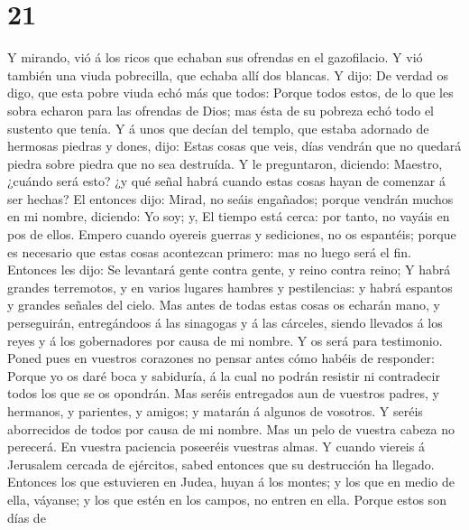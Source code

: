 \hypertarget{section-20}{%
\section{21}\label{section-20}}

 Y mirando, vió á los ricos que echaban sus ofrendas en el
gazofilacio.  Y vió también una viuda pobrecilla, que
echaba allí dos blancas.  Y dijo: De verdad os digo, que
esta pobre viuda echó más que todos:  Porque todos estos,
de lo que les sobra echaron para las ofrendas de Dios; mas ésta de su
pobreza echó todo el sustento que tenía.  Y á unos que
decían del templo, que estaba adornado de hermosas piedras y dones,
dijo:  Estas cosas que veis, días vendrán que no quedará
piedra sobre piedra que no sea destruída.  Y le
preguntaron, diciendo: Maestro, ¿cuándo será esto? ¿y qué señal habrá
cuando estas cosas hayan de comenzar á ser hechas?  El
entonces dijo: Mirad, no seáis engañados; porque vendrán muchos en mi
nombre, diciendo: Yo soy; y, El tiempo está cerca: por tanto, no vayáis
en pos de ellos.  Empero cuando oyereis guerras y
sediciones, no os espantéis; porque es necesario que estas cosas
acontezcan primero: mas no luego será el fin.  Entonces
les dijo: Se levantará gente contra gente, y reino contra reino;
 Y habrá grandes terremotos, y en varios lugares hambres
y pestilencias: y habrá espantos y grandes señales del cielo.
 Mas antes de todas estas cosas os echarán mano, y
perseguirán, entregándoos á las sinagogas y á las cárceles, siendo
llevados á los reyes y á los gobernadores por causa de mi nombre.
 Y os será para testimonio.  Poned pues en
vuestros corazones no pensar antes cómo habéis de responder:
 Porque yo os daré boca y sabiduría, á la cual no podrán
resistir ni contradecir todos los que se os opondrán. 
Mas seréis entregados aun de vuestros padres, y hermanos, y parientes, y
amigos; y matarán á algunos de vosotros.  Y seréis
aborrecidos de todos por causa de mi nombre.  Mas un pelo
de vuestra cabeza no perecerá.  En vuestra paciencia
poseeréis vuestras almas.  Y cuando viereis á Jerusalem
cercada de ejércitos, sabed entonces que su destrucción ha llegado.
 Entonces los que estuvieren en Judea, huyan á los
montes; y los que en medio de ella, váyanse; y los que estén en los
campos, no entren en ella.  Porque estos son días de
